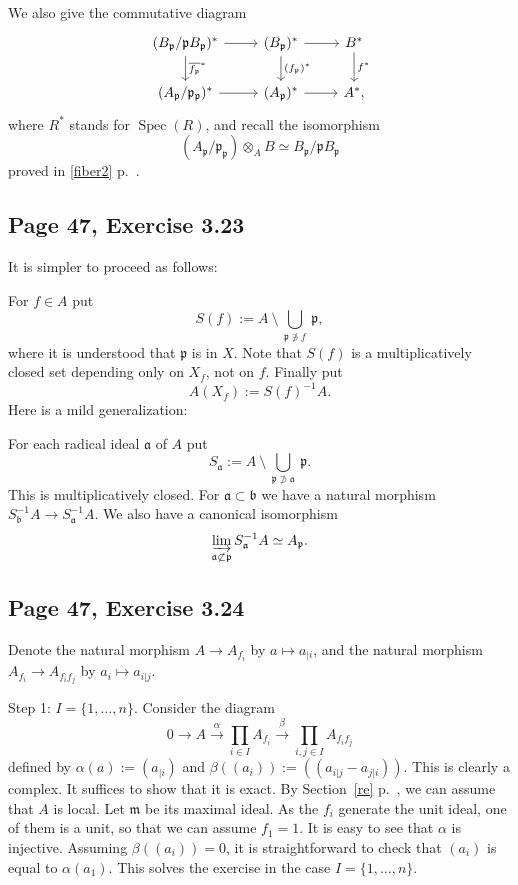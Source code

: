 \documentclass[parskip=half,fontsize=12pt]{scrartcl}%
\newcommand{\oo}{\operatorname}\newcommand{\ooo}{\operatorname*}
\newcommand{\mf}{\mathfrak}
\newcommand{\ppp}{\mf p}
\newcommand{\xr}{\xrightarrow}
\begin{document}
We also give the commutative diagram
$$
\begin{tikzcd}
(B_\ppp/\ppp B_\ppp)^*\ar[d,"\overline{f_\ppp}^*"]\ar[r]&(B_\ppp)^*\ar[d,"(f_\ppp)^*"]\ar[r]& B^*\ar[d,"f^*"]\\ 
(A_\ppp/\ppp_\ppp)^*\ar[r]&(A_\ppp)^*\ar[r]& A^*,
\end{tikzcd}
$$ 
where $R^*$ stands for $\oo{Spec}(R)$, and recall the isomorphism 
$$
(A_\ppp/\ppp_\ppp)\otimes_AB\simeq B_\ppp/\ppp B_\ppp
$$ 
proved in \eqref{fiber2} p.~\pageref{fiber2}. %

\subsection{Page 47, Exercise 3.23}%

It is simpler to proceed as follows:

For $f\in A$ put 
$$
S(f):=A\ \setminus\ \bigcup_{\ppp\notni f}\ \ppp,
$$ 
where it is understood that $\ppp$ is in $X$. Note that $S(f)$ is a multiplicatively closed set depending only on $X_f$, not on $f$. Finally put 
$$
A(X_f):=S(f)^{-1}A.
$$ 
Here is a mild generalization: 

For each radical ideal $\mf a$ of $A$ put 
$$
S_{\mf a}:=A\ \setminus\ \bigcup_{\ppp\not\supset\mf a}\ \ppp.
$$ 
This is multiplicatively closed. For $\mf a\subset\mf b$ we have a natural morphism $S_{\mf b}^{-1}A\to S_{\mf a}^{-1}A$. We also have a canonical isomorphism 
$$
\varinjlim_{\mf a\not\subset\ppp}S_{\mf a}^{-1}A\simeq A_\ppp.
$$

\subsection{Page 47, Exercise 3.24}%

Denote the natural morphism $A\to A_{f_i}$ by $a\mapsto a_{|i}$, and the natural morphism $A_{f_i}\to A_{f_if_j}$ by $a_i\mapsto a_{i|j}$. 

Step 1: $I=\{1,\dots,n\}$. Consider the diagram 
$$
0\to A\xr\alpha\prod_{i\in I}A_{f_i}\xr\beta\prod_{i,j\in I}A_{f_if_j}
$$ 
defined by $\alpha(a):=(a_{|i})$ and $\beta((a_i)):=((a_{i|j}-a_{j|i}))$. This is clearly a complex. It suffices to show that it is exact. By Section~\ref{re} p.~\pageref{re}, we can assume that $A$ is local. Let $\mf m$ be its maximal ideal. As the $f_i$ generate the unit ideal, one of them is a unit, so that we can assume $f_1=1$. It is easy to see that $\alpha$ is injective. Assuming $\beta((a_i))=0$, it is straightforward to check that $(a_i)$ is equal to $\alpha(a_1)$. This solves the exercise in the case $I=\{1,\dots,n\}$.
\end{document}
